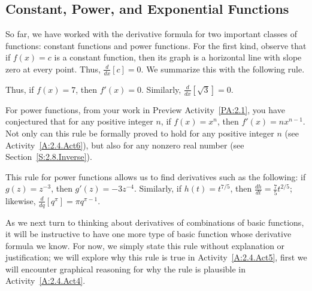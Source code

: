 \subsection*{Constant, Power, and Exponential Functions}

So far, we have worked with the derivative formula for two important classes of functions:  constant functions and power functions.  For the first kind, observe that if $f(x) = c$ is a constant function, then its graph is a horizontal line with slope zero at every point.  Thus, $\frac{d}{dx}[c] = 0$.  We summarize this with the following rule.

Thus, if $f(x) = 7$, then $f'(x) = 0$.  Similarly, $\frac{d}{dx} [\sqrt{3}] = 0.$ 


For power functions, from your work in Preview Activity~\ref{PA:2.1}, you have conjectured that for any positive integer $n$, if $f(x) = x^n$, then $f'(x) = nx^{n-1}$.  Not only can this rule be formally proved to hold for any positive integer $n$ (see Activity~\ref{A:2.4.Act6}), but also for any nonzero real number (see Section~\ref{S:2.8.Inverse}).  


This rule for power functions allows us to find derivatives such as the following:  if $g(z) = z^{-3}$, then $g'(z) = -3z^{-4}$.  Similarly, if $h(t) = t^{7/5}$, then $\frac{dh}{dt} = \frac{7}{5}t^{2/5}$; likewise, $\frac{d}{dq} [q^{\pi}] = \pi q^{\pi - 1}$. 


As we next turn to thinking about derivatives of combinations of basic functions, it will be instructive to have one more type of basic function whose derivative formula we know.  For now, we simply state this rule without explanation or justification; we will explore why this rule is true in Activity~\ref{A:2.4.Act5}, first we will encounter graphical reasoning for why the rule is plausible in Activity~\ref{A:2.4.Act4}.

